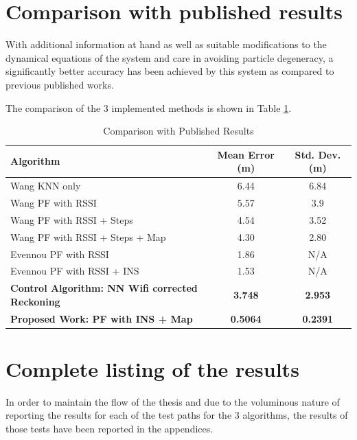\section{Comparison with published results}

With additional information at hand as well as suitable modifications to the 
dynamical equations of the system and care in avoiding particle degeneracy,
a significantly better accuracy has been achieved by this system as compared
to previous published works. 

The comparison of the 3 implemented methods is shown in Table \ref{tbl:pub_comparison}.


\begin{table}
\centering
\begin{tabular}{l c c}
\hline
\hline
Algorithm & Mean Error (m) & Std. Dev. (m)\\
\hline
Wang\cite{Wang} KNN only & 6.44 & 6.84\\
Wang\cite{Wang} PF with RSSI & 5.57 & 3.9\\
Wang\cite{Wang} PF with RSSI + Steps & 4.54 & 3.52\\
Wang\cite{Wang} PF with RSSI + Steps + Map & 4.30 & 2.80\\
Evennou\cite{Evennou} PF with RSSI & 1.86 & N/A\\
Evennou\cite{Evennou} PF with RSSI + INS & 1.53 & N/A\\
\textbf{Control Algorithm: NN Wifi corrected Reckoning} & \textbf{3.748} & \textbf{2.953}\\
\textbf{Proposed Work: PF with INS + Map} & \textbf{0.5064} & \textbf{0.2391}\\
\hline
\end{tabular}
\caption{Comparison with Published Results\label{tbl:pub_comparison}}
\end{table} 

\section{Complete listing of the results}

In order to maintain the flow of the thesis and due to the voluminous
nature of reporting the results for each of the test paths for the 3
algorithms, the results of those tests have been reported in the appendices.



